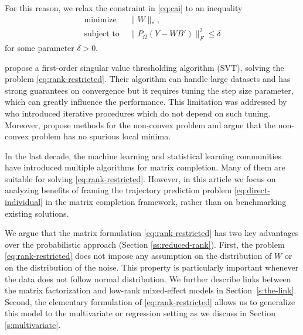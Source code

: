 \documentclass[preprint]{imsart}
\numberwithin{equation}{section}
\theoremstyle{plain}
\DeclareMathOperator*{\rank}{rank}
\begin{document}

For this reason, we relax the constraint in \eqref{eq:cai} to an inequality
\begin{align}
\text{minimize\ \ } & \|W\|_*,  \nonumber\\
\text{subject to\ \ } & \| P_\Omega(Y - WB') \|_F^2 \leq \delta
\label{eq:rank-restricted}
\end{align}
for some parameter $\delta > 0$.

\citet{cai2010singular} propose a first-order singular value thresholding algorithm (SVT), solving the problem \eqref{eq:rank-restricted}. Their algorithm can handle large datasets and has strong guarantees on convergence but it requires tuning the step size parameter, which can greatly influence the performance. This limitation was addressed by \citet{ma2011fixed,mazumder2010spectral,hastie2015matrix} who introduced iterative procedures which do not depend on such tuning. Moreover, \citet{hardt2014fast,chen2015fast} propose methods for the non-convex problem and \citet{ge2016matrix} argue that the non-convex problem has no spurious local minima.

In the last decade, the machine learning and statistical learning communities have introduced multiple algorithms for matrix completion. Many of them are suitable for solving \eqref{eq:rank-restricted}. However, in this article we focus on analyzing benefits of framing the trajectory prediction problem \eqref{eq:direct-individual} in the matrix completion framework, rather than on benchmarking existing solutions.

We argue that the matrix formulation \eqref{eq:rank-restricted} has two key advantages over the probabilistic approach (Section \ref{ss:reduced-rank}). First, the problem \eqref{eq:rank-restricted} does not impose any assumption on the distribution of $W$ or on the distribution of the noise. This property is particularly important whenever the data does not follow normal distribution. We further describe links between the matrix factorization and low-rank mixed-effect models in Section~\ref{s:the-link}. Second, the elementary formulation of \eqref{eq:rank-restricted} allows us to generalize this model to the multivariate or regression setting as we discuss in Section \ref{s:multivariate}.  
\end{document}
